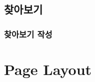 \documentclass[12pt, a4paper, oneside]{book}
\let\stdsection\section
\renewcommand\section{\newpage\stdsection}
\begin{document}
	
		\newpage  \null
		
			
	
			\cleardoublepage
				



	\chapter{찾아보기}

		\minitoc				%
		\doublespace
	


	\newpage  \null
	\section{찾아보기 작성}
	
		
			

			

			

			

			

			

			

			

			

			

			







	 {\protect\newpage}
	\part{ Page Layout}
	
			\parttoc
	
	
	
	
	


\end{document}
